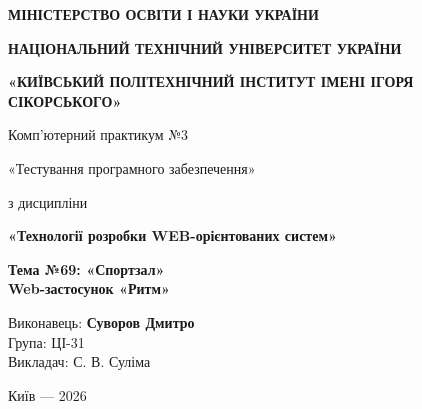 \documentclass[12pt,a4paper]{article}
\newcommand{\AuthorName}{Суворов Дмитро}
\newcommand{\StudentGroup}{ЦІ-31}
\begin{document}
\begin{titlepage}\thispagestyle{empty}\centering
{\small\sffamily\bfseries МІНІСТЕРСТВО ОСВІТИ І НАУКИ УКРАЇНИ}\par\vspace{5mm}
{\small\sffamily\bfseries НАЦІОНАЛЬНИЙ ТЕХНІЧНИЙ УНІВЕРСИТЕТ УКРАЇНИ}\par
{\small\sffamily\bfseries «КИЇВСЬКИЙ ПОЛІТЕХНІЧНИЙ ІНСТИТУТ ІМЕНІ ІГОРЯ СІКОРСЬКОГО»}\par
{}\par\vspace{7mm}
{\Large Комп'ютерний практикум №3}\par\vspace{5mm}
{\large «Тестування програмного забезпечення»}\par\vspace{12mm}
з дисципліни\par\medskip
{\large\bfseries «Технології розробки WEB-орієнтованих систем»}\par\vspace{15mm}
\begin{infobox}\centering\large\bfseries Тема №69: «Спортзал»\\Web-застосунок «Ритм»\end{infobox}
\vfill\begin{flushright}Виконавець: \textbf{\AuthorName}\\Група: \StudentGroup\\Викладач: С. В. Суліма\end{flushright}\vfill
Київ --- 2026
\end{titlepage}
\tableofcontents\clearpage
\end{document}
